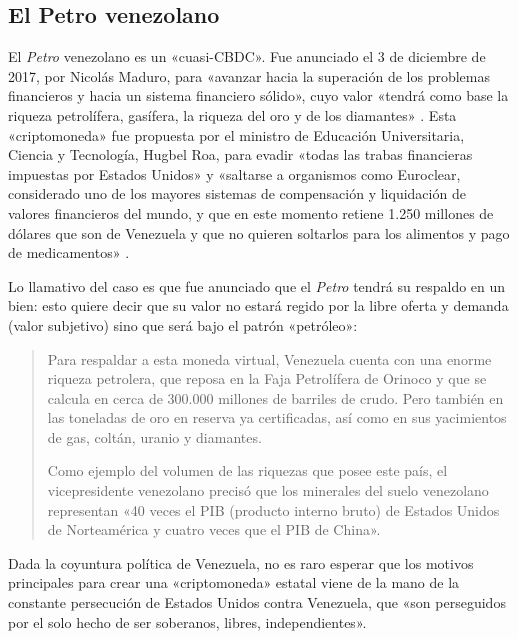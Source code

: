 \documentclass[12pt,a4paper,twoside]{book}
\begin{document}
\subsection{El Petro venezolano}
El \textit{Petro} venezolano es un «cuasi-CBDC». Fue anunciado el 3 de diciembre de 2017, por Nicolás Maduro, para «avanzar hacia la superación de los problemas financieros y hacia un sistema financiero sólido», cuyo valor «tendrá como base la riqueza petrolífera, gasífera, la riqueza del oro y de los diamantes» \cite{petro:anuncio}. Esta «criptomoneda» fue propuesta por el ministro de Educación Universitaria, Ciencia y Tecnología, Hugbel Roa, para evadir «todas las trabas financieras impuestas por Estados Unidos» y «saltarse a organismos como Euroclear, considerado uno de los mayores sistemas de compensación y liquidación de valores financieros del mundo, y que en este momento retiene 1.250 millones de dólares que son de Venezuela y que no quieren soltarlos para los alimentos y pago de medicamentos» \cite{petro:anuncio2}. 

Lo llamativo del caso es que fue anunciado que el \textit{Petro} tendrá su respaldo en un bien: esto quiere decir que su valor no estará regido por la libre oferta y demanda (valor subjetivo) sino que será bajo el patrón «petróleo»:

\begin{quotation}
Para respaldar a esta moneda virtual, Venezuela cuenta con una enorme riqueza petrolera, que reposa en la Faja Petrolífera de Orinoco y que se calcula en cerca de 300.000 millones de barriles de crudo. Pero también en las toneladas de oro en reserva ya certificadas, así como en sus yacimientos de gas, coltán, uranio y diamantes.

Como ejemplo del volumen de las riquezas que posee este país, el vicepresidente venezolano precisó que los minerales del suelo venezolano representan «40 veces el PIB (producto interno bruto) de Estados Unidos de Norteamérica y cuatro veces que el PIB de China». \cite{petro:anuncio2}
\end{quotation}

Dada la coyuntura política de Venezuela, no es raro esperar que los motivos principales para crear una «criptomoneda» estatal viene de la mano de la constante persecución de Estados Unidos contra Venezuela, que «son perseguidos por el solo hecho de ser soberanos, libres, independientes».
\end{document}
